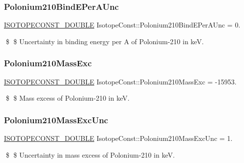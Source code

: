 \subsubsection{\texorpdfstring{Polonium210\+Bind\+E\+Per\+A\+Unc}{Polonium210BindEPerAUnc}}
{\footnotesize\ttfamily \mbox{\hyperlink{group___isotope_const-_macros_ga8f45a7272ce02c0b4c65c44636ed719a}{I\+S\+O\+T\+O\+P\+E\+C\+O\+N\+S\+T\+\_\+\+D\+O\+U\+B\+LE}} Isotope\+Const\+::\+Polonium210\+Bind\+E\+Per\+A\+Unc = 0.}

\$ \$ Uncertainty in binding energy per A of Polonium-\/210 in keV. \mbox{\label{group___isotope_const-_polonium-_po210_gae6ed7b3e11d89c902eb5411966c788a6}} 
\subsubsection{\texorpdfstring{Polonium210\+Mass\+Exc}{Polonium210MassExc}}
{\footnotesize\ttfamily \mbox{\hyperlink{group___isotope_const-_macros_ga8f45a7272ce02c0b4c65c44636ed719a}{I\+S\+O\+T\+O\+P\+E\+C\+O\+N\+S\+T\+\_\+\+D\+O\+U\+B\+LE}} Isotope\+Const\+::\+Polonium210\+Mass\+Exc = -\/15953.}

\$ \$ Mass excess of Polonium-\/210 in keV. \mbox{\label{group___isotope_const-_polonium-_po210_gaea150eba1707833c0079543e5c591ce6}} 
\subsubsection{\texorpdfstring{Polonium210\+Mass\+Exc\+Unc}{Polonium210MassExcUnc}}
{\footnotesize\ttfamily \mbox{\hyperlink{group___isotope_const-_macros_ga8f45a7272ce02c0b4c65c44636ed719a}{I\+S\+O\+T\+O\+P\+E\+C\+O\+N\+S\+T\+\_\+\+D\+O\+U\+B\+LE}} Isotope\+Const\+::\+Polonium210\+Mass\+Exc\+Unc = 1.}

\$ \$ Uncertainty in mass excess of Polonium-\/210 in keV. \mbox{\label{group___isotope_const-_polonium-_po210_ga8f6b187e40652ce87258bcbbdab91a07}} 
